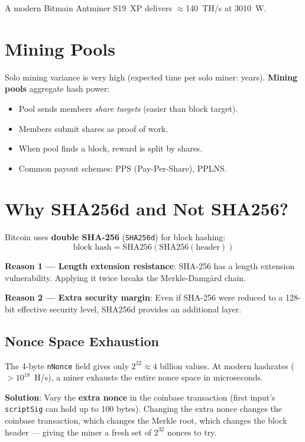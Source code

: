 \documentclass[12pt,a4paper,openany]{book}
\theoremstyle{definition}
\theoremstyle{plain}
\theoremstyle{remark}
\begin{document}
A modern Bitmain Antminer S19~XP delivers $\approx$140~TH/s at 3010~W.

\section{Mining Pools}

Solo mining variance is very high (expected time per solo miner: years).
\textbf{Mining pools} aggregate hash power:

\begin{itemize}
  \item Pool sends members \emph{share targets} (easier than block target).
  \item Members submit shares as proof of work.
  \item When pool finds a block, reward is split by shares.
  \item Common payout schemes: PPS (Pay-Per-Share), PPLNS.
\end{itemize}

\section{Why SHA256d and Not SHA256?}

Bitcoin uses \textbf{double SHA-256} (\texttt{SHA256d}) for block
hashing:
\[
  \text{block hash} = \mathrm{SHA256}(\mathrm{SHA256}(\text{header}))
\]

\textbf{Reason 1 — Length extension resistance}: SHA-256 has a length
extension vulnerability.  Applying it twice breaks the Merkle-Damg\aa rd
chain.

\textbf{Reason 2 — Extra security margin}: Even if SHA-256 were reduced
to a 128-bit effective security level, SHA256d provides an additional
layer.

\subsection{Nonce Space Exhaustion}

The 4-byte \texttt{nNonce} field gives only $2^{32}\approx 4$ billion
values.  At modern hashrates ($> 10^{18}$~H/s), a miner exhausts the
entire nonce space in microseconds.

\textbf{Solution}: Vary the \textbf{extra nonce} in the coinbase
transaction (first input's \texttt{scriptSig} can hold up to 100 bytes).
Changing the extra nonce changes the coinbase transaction, which changes
the Merkle root, which changes the block header — giving the miner a
fresh set of $2^{32}$ nonces to try.
\end{document}
